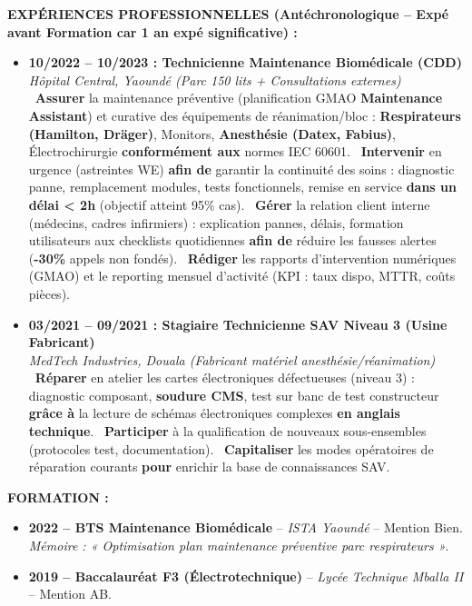 \documentclass[11pt]{article}
\begin{document}
\begin{exoresolu}
    \textbf{EXPÉRIENCES PROFESSIONNELLES (Antéchronologique -- \textbf{Expé avant Formation} car 1 an expé significative) :}
    \begin{itemize}
        \item \textbf{10/2022 -- 10/2023 : Technicienne Maintenance Biomédicale (CDD)} \\
              \textit{Hôpital Central, Yaoundé (Parc 150 lits + Consultations externes)} \\
              \textbullet\ \textbf{Assurer} la maintenance préventive (planification GMAO \textbf{Maintenance Assistant}) et curative des équipements de réanimation/bloc : \textbf{Respirateurs (Hamilton, Dräger)}, Monitors, \textbf{Anesthésie (Datex, Fabius)}, Électrochirurgie \textbf{conformément aux} normes IEC 60601.
              \textbullet\ \textbf{Intervenir} en urgence (astreintes WE) \textbf{afin de} garantir la continuité des soins : diagnostic panne, remplacement modules, tests fonctionnels, remise en service \textbf{dans un délai < 2h} (objectif atteint 95\% cas).
              \textbullet\ \textbf{Gérer} la relation client interne (médecins, cadres infirmiers) : explication pannes, délais, formation utilisateurs aux checklists quotidiennes \textbf{afin de} réduire les fausses alertes (\textbf{-30\%} appels non fondés).
              \textbullet\ \textbf{Rédiger} les rapports d'intervention numériques (GMAO) et le reporting mensuel d'activité (KPI : taux dispo, MTTR, coûts pièces).
        \item \textbf{03/2021 -- 09/2021 : Stagiaire Technicienne SAV Niveau 3 (Usine Fabricant)} \\
              \textit{MedTech Industries, Douala (Fabricant matériel anesthésie/réanimation)} \\
              \textbullet\ \textbf{Réparer} en atelier les cartes électroniques défectueuses (niveau 3) : diagnostic composant, \textbf{soudure CMS}, test sur banc de test constructeur \textbf{grâce à} la lecture de schémas électroniques complexes \textbf{en anglais technique}.
              \textbullet\ \textbf{Participer} à la qualification de nouveaux sous-ensembles (protocoles test, documentation).
              \textbullet\ \textbf{Capitaliser} les modes opératoires de réparation courants \textbf{pour} enrichir la base de connaissances SAV.
    \end{itemize}

    \textbf{FORMATION :}
    \begin{itemize}
        \item \textbf{2022 -- BTS Maintenance Biomédicale} -- \textit{ISTA Yaoundé} -- Mention Bien. \textit{Mémoire : « Optimisation plan maintenance préventive parc respirateurs »}.
        \item \textbf{2019 -- Baccalauréat F3 (Électrotechnique)} -- \textit{Lycée Technique Mballa II} -- Mention AB.
    \end{itemize}


\end{exoresolu}
\end{document}
